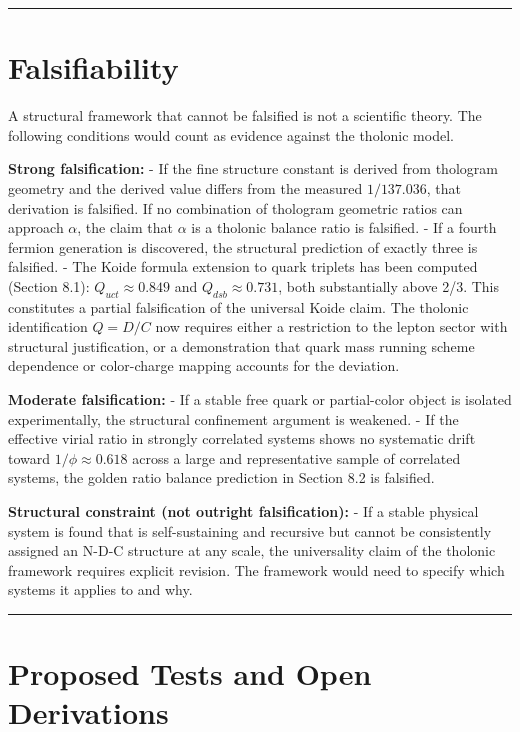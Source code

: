 \documentclass[12pt]{article}
\begin{document}
\begin{center}\rule{0.5\linewidth}{0.5pt}\end{center}

\section{Falsifiability}\label{falsifiability}

A structural framework that cannot be falsified is not a scientific
theory. The following conditions would count as evidence against the
tholonic model.

\textbf{Strong falsification:} - If the fine structure constant is
derived from thologram geometry and the derived value differs from the
measured \(1/137.036\), that derivation is falsified. If no combination
of thologram geometric ratios can approach \(\alpha\), the claim that
\(\alpha\) is a tholonic balance ratio is falsified. - If a fourth
fermion generation is discovered, the structural prediction of exactly
three is falsified. - The Koide formula extension to quark triplets has
been computed (Section 8.1): \(Q_{uct} \approx 0.849\) and
\(Q_{dsb} \approx 0.731\), both substantially above 2/3. This
constitutes a partial falsification of the universal Koide claim. The
tholonic identification \(Q = D/C\) now requires either a restriction to
the lepton sector with structural justification, or a demonstration that
quark mass running scheme dependence or color-charge mapping accounts
for the deviation.

\textbf{Moderate falsification:} - If a stable free quark or
partial-color object is isolated experimentally, the structural
confinement argument is weakened. - If the effective virial ratio in
strongly correlated systems shows no systematic drift toward
\(1/\phi \approx 0.618\) across a large and representative sample of
correlated systems, the golden ratio balance prediction in Section 8.2
is falsified.

\textbf{Structural constraint (not outright falsification):} - If a
stable physical system is found that is self-sustaining and recursive
but cannot be consistently assigned an N-D-C structure at any scale, the
universality claim of the tholonic framework requires explicit revision.
The framework would need to specify which systems it applies to and why.

\begin{center}\rule{0.5\linewidth}{0.5pt}\end{center}

\section{Proposed Tests and Open Derivations}\label{proposed-tests-and-open-derivations}
\end{document}
